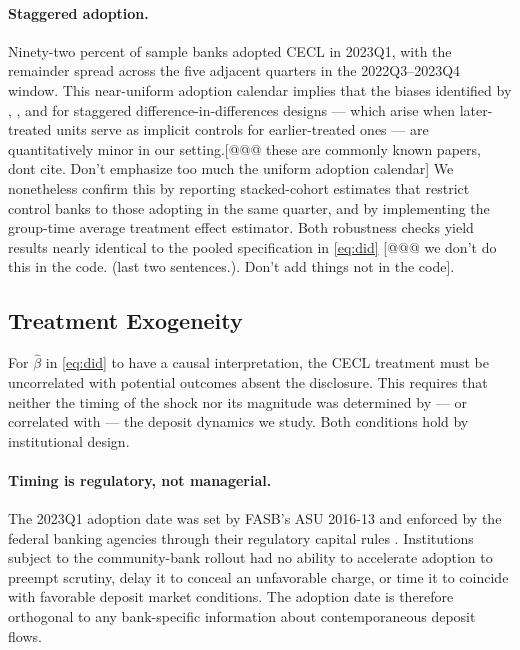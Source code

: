 \paragraph{Staggered adoption.}
Ninety-two percent of sample banks adopted CECL in 2023Q1, with the remainder
spread across the five adjacent quarters in the 2022Q3--2023Q4 window.  This
near-uniform adoption calendar implies that the biases identified by
\citet{callaway2021difference}, \citet{sun2021estimating}, and
\citet{dechaisemartin2020two} for staggered difference-in-differences designs
--- which arise when later-treated units serve as implicit controls for
earlier-treated ones --- are quantitatively minor in our setting.[@@@ these are commonly known papers, dont cite. Don't emphasize too much the uniform adoption calendar]  We
nonetheless confirm this by reporting stacked-cohort estimates that
restrict control banks to those adopting in the same quarter, and by
implementing the \citet{callaway2021difference} group-time average treatment
effect estimator.  Both robustness checks yield results nearly identical to
the pooled specification in \eqref{eq:did} [@@@ we don't do this in the code. (last two sentences.). Don't add things not in the code].

\subsection{Treatment Exogeneity}
\label{sec:identification:predetermination}

For $\hat{\beta}$ in \eqref{eq:did} to have a causal interpretation,
the CECL treatment must be uncorrelated with potential outcomes absent the
disclosure.  This requires that neither the timing of the shock nor its
magnitude was determined by --- or correlated with --- the deposit dynamics we
study.  Both conditions hold by institutional design.

\paragraph{Timing is regulatory, not managerial.}
The 2023Q1 adoption date was set by FASB's ASU 2016-13 and enforced by the
federal banking agencies through their regulatory capital rules
\citep{FASB2016}.  Institutions subject to the community-bank rollout had
no ability to accelerate adoption to preempt scrutiny, delay it to conceal an
unfavorable charge, or time it to coincide with favorable deposit market
conditions.  The adoption date is therefore orthogonal to any bank-specific
information about contemporaneous deposit flows.

